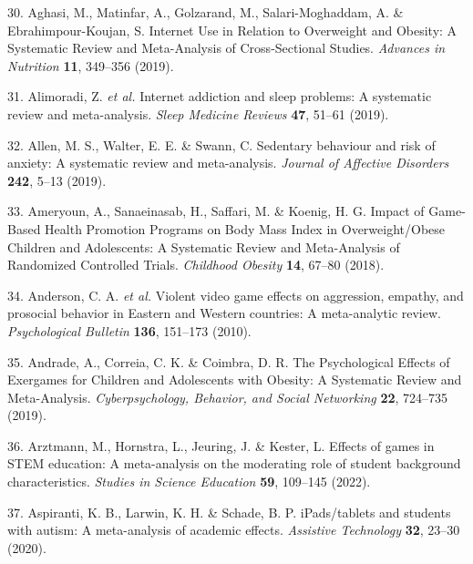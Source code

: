 \documentclass[
  english,
  man]{apa6}
\newenvironment{cslreferences}%
  {}%
  {\par}
\begin{document}
\begin{cslreferences}
\leavevmode\hypertarget{ref-aghasiInternetUseRelation2019}{}%
30. Aghasi, M., Matinfar, A., Golzarand, M., Salari-Moghaddam, A. \& Ebrahimpour-Koujan, S. Internet Use in Relation to Overweight and Obesity: A Systematic Review and Meta-Analysis of Cross-Sectional Studies. \emph{Advances in Nutrition} \textbf{11}, 349--356 (2019).

\leavevmode\hypertarget{ref-alimoradiInternetAddictionSleep2019}{}%
31. Alimoradi, Z. \emph{et al.} Internet addiction and sleep problems: A systematic review and meta-analysis. \emph{Sleep Medicine Reviews} \textbf{47}, 51--61 (2019).

\leavevmode\hypertarget{ref-allenSedentaryBehaviourRisk2019}{}%
32. Allen, M. S., Walter, E. E. \& Swann, C. Sedentary behaviour and risk of anxiety: A systematic review and meta-analysis. \emph{Journal of Affective Disorders} \textbf{242}, 5--13 (2019).

\leavevmode\hypertarget{ref-ameryounImpactGameBasedHealth2018}{}%
33. Ameryoun, A., Sanaeinasab, H., Saffari, M. \& Koenig, H. G. Impact of Game-Based Health Promotion Programs on Body Mass Index in Overweight/Obese Children and Adolescents: A Systematic Review and Meta-Analysis of Randomized Controlled Trials. \emph{Childhood Obesity} \textbf{14}, 67--80 (2018).

\leavevmode\hypertarget{ref-andersonViolentVideoGame2010}{}%
34. Anderson, C. A. \emph{et al.} Violent video game effects on aggression, empathy, and prosocial behavior in Eastern and Western countries: A meta-analytic review. \emph{Psychological Bulletin} \textbf{136}, 151--173 (2010).

\leavevmode\hypertarget{ref-andradePsychologicalEffectsExergames2019}{}%
35. Andrade, A., Correia, C. K. \& Coimbra, D. R. The Psychological Effects of Exergames for Children and Adolescents with Obesity: A Systematic Review and Meta-Analysis. \emph{Cyberpsychology, Behavior, and Social Networking} \textbf{22}, 724--735 (2019).

\leavevmode\hypertarget{ref-arztmannEffectsGamesSTEM2022}{}%
36. Arztmann, M., Hornstra, L., Jeuring, J. \& Kester, L. Effects of games in STEM education: A meta-analysis on the moderating role of student background characteristics. \emph{Studies in Science Education} \textbf{59}, 109--145 (2022).

\leavevmode\hypertarget{ref-aspirantiIPadsTabletsStudents2020}{}%
37. Aspiranti, K. B., Larwin, K. H. \& Schade, B. P. iPads/tablets and students with autism: A meta-analysis of academic effects. \emph{Assistive Technology} \textbf{32}, 23--30 (2020).


\end{cslreferences}
\end{document}
